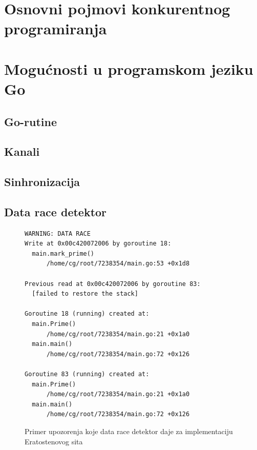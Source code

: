 \documentclass[12pt,oneside]{memoir}
\begin{document}
\section{Osnovni pojmovi konkurentnog programiranja}

\section{Mogućnosti u programskom jeziku Go}

\subsection{Go-rutine}

\subsection{Kanali}

\subsection{Sinhronizacija}

\subsection{Data race detektor}

\begin{figure}
\begin{center}

\begin{Verbatim}[fontsize=\small]
WARNING: DATA RACE
Write at 0x00c420072006 by goroutine 18:
  main.mark_prime()
      /home/cg/root/7238354/main.go:53 +0x1d8

Previous read at 0x00c420072006 by goroutine 83:
  [failed to restore the stack]

Goroutine 18 (running) created at:
  main.Prime()
      /home/cg/root/7238354/main.go:21 +0x1a0
  main.main()
      /home/cg/root/7238354/main.go:72 +0x126

Goroutine 83 (running) created at:
  main.Prime()
      /home/cg/root/7238354/main.go:21 +0x1a0
  main.main()
      /home/cg/root/7238354/main.go:72 +0x126
\end{Verbatim}

\caption{Primer upozorenja koje data race detektor daje za implementaciju Eratostenovog sita}
\label{fig:datarace}
\end{center}
\end{figure}
\end{document}
